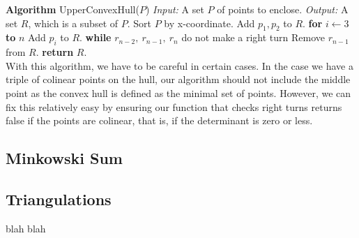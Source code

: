 \documentclass[12pt]{article}
\begin{document}
\begin{multicols}{2}
\textbf{Algorithm} UpperConvexHull($P$) \newline 
\emph{Input:} A set $P$ of points to enclose. \newline
\emph{Output:} A set $R$, which is a subset of $P$. \newline
Sort $P$ by x-coordinate. \newline
Add $p_1, p_2$ to $R$. \newline
\textbf{for} $i \leftarrow 3$ \textbf{to} $n$ \newline
\indent Add $p_i$ to $R$. \newline
\indent \textbf{while} $r_{n-2},\ r_{n-1},\ r_n$ do not make a right turn \newline
\indent \indent Remove $r_{n-1}$ from $R$. \newline
\textbf{return} $R$. \newline \\
With this algorithm, we have to be careful in certain cases. In the case we have a triple of colinear points on the hull, our algorithm should not include the middle point as the convex hull is defined as the minimal set of points. However, we can fix this relatively easy by ensuring our function that checks right turns returns false if the points are colinear, that is, if the determinant is zero or less.
\subsection{Minkowski Sum}
\indent 

\subsection{Triangulations}
\indent blah blah

\end{multicols}
\end{document}
